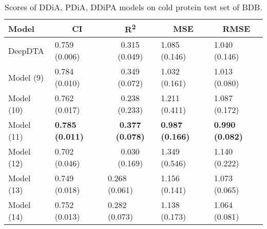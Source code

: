 \begin{table}
\centering
\caption{Scores of DDiA, PDiA, DDiPA models on cold protein test set of BDB.}
\vspace{0.25em}
\begin{tabular}{|l|l|c|l|l|} 
\hline
Model & \multicolumn{1}{c|}{CI} & R\textsuperscript{2} & \multicolumn{1}{c|}{MSE} & \multicolumn{1}{c|}{RMSE} \\ 
\hline
DeepDTA & 0.759 (0.006) & 0.315 (0.049) & 1.085 (0.146) & 1.040 (0.146) \\ 
\hline
Model (9) & 0.784 (0.010) & 0.349 (0.072) & 1.032 (0.161) & 1.013 (0.080) \\ 
\hline
Model (10) & 0.762 (0.017) & 0.238 (0.233) & 1.211 (0.411) & 1.087 (0.172) \\ 
\hline
Model (11) & \textbf{0.785 (0.011)} & \textbf{0.377 (0.078)} & \textbf{0.987 (0.166)} & \textbf{0.990 (0.082)} \\ 
\hline
Model (12) & 0.702 (0.046) & 0.030 (0.169) & 1.349 (0.546) & 1.140 (0.222) \\ 
\hline
Model (13) & 0.749 (0.018) & \multicolumn{1}{l|}{0.268 (0.061)} & 1.156 (0.141) & 1.073 (0.065) \\ 
\hline
Model (14) & 0.752 (0.013) & \multicolumn{1}{l|}{0.282 (0.073)} & 1.138 (0.173) & 1.064 (0.081) \\
\hline
\end{tabular}
\label{tab:disease_cold_protein}
\end{table}